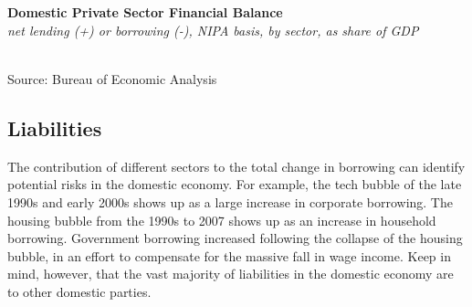 \documentclass{report}
\makeatletter
\newcommand{\tbllink}[1]{\href{https://raw.githubusercontent.com/bdecon/US-chartbook/master/chartbook/data/#1}{\faTable}}
\newcommand*\short[1]{\expandafter\@gobbletwo\number\numexpr#1\relax}
\newcommand{\sbar}[4]{
		\addplot[ybar stacked, bar width=2.7pt, draw opacity=0, fill=#1] 
			table [x=#2, y=#3, col sep=comma]{#4};}
\newcommand{\dateaxisticks}{
		date coordinates in=x, axis line style={draw=none},
		xmax={2020-02-01},
		max space between ticks=40,	    
		xtick={{1990-01-01}, {1992-01-01}, {1994-01-01}, 
			{1996-01-01}, {1998-01-01}, {2000-01-01}, 
			{2002-01-01}, {2004-01-01}, {2006-01-01},
			{2008-01-01}, {2010-01-01}, {2012-01-01}, {2014-01-01},
		    {2016-01-01}, {2018-01-01}, {2020-01-01}},
		minor xtick={{1989-01-01}, {1991-01-01}, {1993-01-01},
			{1995-01-01}, {1997-01-01}, {1999-01-01}, 
			{2001-01-01}, {2003-01-01}, {2005-01-01}, {2007-01-01},
		    {2009-01-01}, {2011-01-01}, {2013-01-01}, {2015-01-01},
		    {2017-01-01}, {2019-01-01}},
		enlarge y limits={0.06}, enlarge x limits={0.01},
		}
\newcommand{\bbar}[2]{extra #1 ticks = {{#2}}, extra #1 tick labels = ,
		extra #1 tick style = {grid=major, grid style={thick, black!25}},}
\newcommand{\rbars}{
		\fill[color=black!10] (axis cs:{1990-07-01},\pgfkeysvalueof{/pgfplots/ymin}) rectangle 
			(axis cs:{1991-03-01}, \pgfkeysvalueof{/pgfplots/ymax});
		\fill[color=black!10] (axis cs:{2007-12-01},\pgfkeysvalueof{/pgfplots/ymin}) rectangle 
			(axis cs:{2009-07-01}, \pgfkeysvalueof{/pgfplots/ymax});
		\fill[color=black!10] (axis cs:{2001-03-01},\pgfkeysvalueof{/pgfplots/ymin}) rectangle 
			(axis cs:{2001-11-01}, \pgfkeysvalueof{/pgfplots/ymax});}
\makeatother
\begin{document}
{{\begin{minipage}{0.76\textwidth}
\vspace{2mm}

\small  \\

\\

\vspace{2mm}

\noindent \normalsize \textbf{Domestic Private Sector Financial Balance}\\
\footnotesize{\textit{net lending (+) or borrowing (-), NIPA basis, by sector, as share of GDP}}\\
\noindent \hspace*{-3mm} \\
\footnotesize{Source: Bureau of Economic Analysis} \hfill \tbllink{sectbal2.csv}

\end{minipage}

\newpage

\begin{minipage}{0.76\textwidth}

\subsection*{\color{black!70} \seriffont Liabilities}

\small The contribution of different sectors to the total change in borrowing can identify potential risks in the domestic economy. For example, the tech bubble of the late 1990s and early 2000s shows up as a large increase in corporate borrowing. The housing bubble from the 1990s to 2007 shows up as an increase in household borrowing. Government borrowing increased following the collapse of the housing bubble, in an effort to compensate for the massive fall in wage income. Keep in mind, however, that the vast majority of liabilities in the domestic economy are to other domestic parties.\\


\end{minipage}}}
\end{document}
